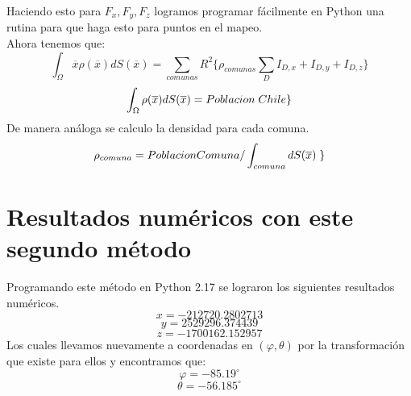 \documentclass[20pt]{report}
\begin{document}
\begin{itemize}
Haciendo esto para $F_x,F_y,F_z$ logramos programar f\'acilmente en Python una rutina para que haga esto para puntos en el mapeo.
\\
Ahora tenemos que:
\begin{equation}
\int_{\Omega} \overline{x}\rho(\overline{x}) dS(\overline{x})=\sum_{comunas} R^2  \lbrace \rho_{comunas} \sum_{D} I_{D,x} + I_{D,y}+ I_{D,z} \rbrace 
\end{equation}
\begin{equation}
\int_{\Omega} \rho(\overline{x}) dS(\overline{x})=Poblacion \hspace{0.1cm} Chile \rbrace 
\end{equation}
De manera an\'aloga se calculo la densidad para cada  comuna.
\begin{equation}
\rho_{comuna}= PoblacionComuna/ \int_{comuna} dS(\overline{x}) \hspace{0.1cm}  \rbrace 
\end{equation}

\label{cap.introduccion}\section{Resultados num\'ericos con este segundo m\'etodo} 
Programando este m\'etodo en Python 2.17 se lograron los siguientes resultados num\'ericos. \\
\[x=-212720.2802713\]
\[y=2529296.374439\]
\[z=-1700162.152957\]
Los cuales llevamos nuevamente a coordenadas en $(\varphi, \theta)$ por la transformaci\'on que existe para ellos y encontramos que:
\[\varphi=-85.19^\circ \]
\[\theta=-56.185^\circ \]
\begin{figure}[H]
    \centering
\end{figure}


\end{itemize}
\end{document}

